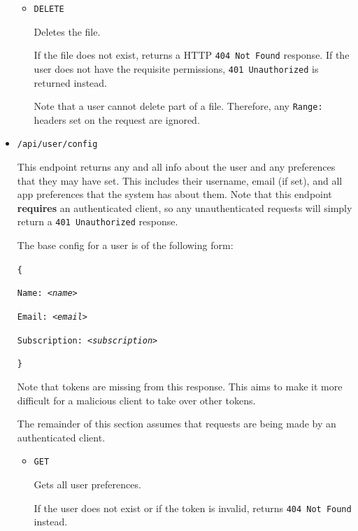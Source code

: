 \documentclass[12pt,a4paper]{report}
\begin{document}
\begin{itemize}
\begin{itemize}
		      \item \texttt{DELETE}

		            Deletes the file.

		            If the file does not exist, returns a HTTP \texttt{404 Not Found} response.
		            If the user does not have the requisite permissions, \texttt{401 Unauthorized} is returned instead.

		            Note that a user cannot delete part of a file.
		            Therefore, any \texttt{Range:\textasteriskcentered} headers set on the request are ignored.
	      \end{itemize}

	\item \texttt{/api/user/config}

	      This endpoint returns any and all info about the user and any preferences that they may have set.
	      This includes their username, email (if set), and all app preferences that the system has about them.
	      Note that this endpoint \textbf{requires} an authenticated client, so any unauthenticated requests will simply return a \texttt{401 Unauthorized} response.

	      The base config for a user is of the following form:


	      \texttt{\{ }

	      \texttt{\quad Name: \textsl{<name>}}

	      \texttt{\quad Email: \textsl{<email>}}

	      \texttt{\quad Subscription: \textsl{<subscription>}}

	      \texttt{\} }

	      Note that tokens are missing from this response.
	      This aims to make it more difficult for a malicious client to take over other tokens.

	      The remainder of this section assumes that requests are being made by an authenticated client.

	      \begin{itemize}
		      \item \texttt{GET}

		            Gets all user preferences.

		            If the user does not exist or if the token is invalid, returns \texttt{404 Not Found} instead.


\end{itemize}
\end{itemize}
\end{document}
